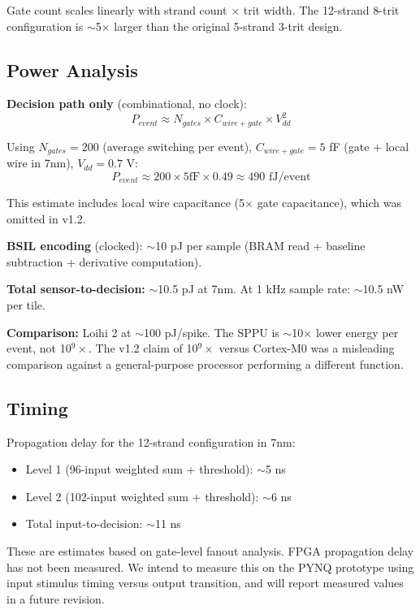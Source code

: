 \documentclass[11pt, a4paper]{article}
\begin{document}
Gate count scales linearly with strand count $\times$ trit width.
The 12-strand 8-trit configuration is $\sim$5$\times$ larger than
the original 5-strand 3-trit design.

\subsection{Power Analysis}

\textbf{Decision path only} (combinational, no clock):
\begin{equation}
  P_{event} \approx N_{gates} \times C_{wire+gate} \times V_{dd}^2
\end{equation}

Using $N_{gates} = 200$ (average switching per event),
$C_{wire+gate} = 5$ fF (gate + local wire in 7nm), $V_{dd} = 0.7$ V:
\begin{equation}
  P_{event} \approx 200 \times 5\text{fF} \times 0.49 \approx 490\text{ fJ/event}
\end{equation}

This estimate includes local wire capacitance (5$\times$ gate
capacitance), which was omitted in v1.2.

\textbf{BSIL encoding} (clocked): $\sim$10 pJ per sample
(BRAM read + baseline subtraction + derivative computation).

\textbf{Total sensor-to-decision:} $\sim$10.5 pJ at 7nm.
At 1 kHz sample rate: $\sim$10.5 nW per tile.

\textbf{Comparison:} Loihi 2 at $\sim$100 pJ/spike. The SPPU is
$\sim$10$\times$ lower energy per event, not 10$^9\times$. The
v1.2 claim of 10$^9\times$ versus Cortex-M0 was a misleading
comparison against a general-purpose processor performing a
different function.

\subsection{Timing}

Propagation delay for the 12-strand configuration in 7nm:
\begin{itemize}[nosep]
  \item Level 1 (96-input weighted sum + threshold): $\sim$5 ns
  \item Level 2 (102-input weighted sum + threshold): $\sim$6 ns
  \item Total input-to-decision: $\sim$11 ns
\end{itemize}

These are estimates based on gate-level fanout analysis. FPGA
propagation delay has not been measured. We intend to measure
this on the PYNQ prototype using input stimulus timing versus
output transition, and will report measured values in a future
revision.
\end{document}
